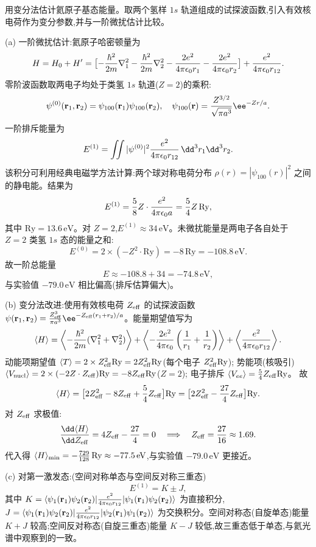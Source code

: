 \begin{question}
用变分法估计氦原子基态能量。取两个氢样 $1s$ 轨道组成的试探波函数,引入有效核电荷作为变分参数,并与一阶微扰估计比较。
\end{question}
\begin{solution}
(a) 一阶微扰估计:氦原子哈密顿量为
\[
H = H_0 + H' = \bigl[ -{\hbar^2\over2m}\nabla_1^2 - {\hbar^2\over2m}\nabla_2^2 - {2e^2\over4\pi\epsilon_0 r_1} - {2e^2\over4\pi\epsilon_0 r_2} \bigr] + {e^2\over4\pi\epsilon_0 r_{12}}.
\]
零阶波函数取两电子均处于类氢 $1s$ 轨道($Z=2$)的乘积:
\[
\psi^{(0)}(\mathbf r_1,\mathbf r_2) = \psi_{100}(\mathbf r_1)\psi_{100}(\mathbf r_2),
\quad \psi_{100}(\mathbf r) = {Z^{3/2}\over\sqrt{\pi a^3}}\ee^{-Zr/a}.
\]
一阶排斥能量为
\[
E^{(1)} = \iint |\psi^{(0)}|^2 {e^2\over4\pi\epsilon_0 r_{12}}\,\dd^3r_1\dd^3r_2.
\]
该积分可利用经典电磁学方法计算:两个球对称电荷分布 $\rho(r)=|\psi_{100}(r)|^2$ 之间的静电能。结果为
\[
E^{(1)} = {5\over8}Z\cdot{e^2\over4\pi\epsilon_0 a} = {5\over4}Z\,\mathrm{Ry},
\]
其中 $\mathrm{Ry}=13.6\,\mathrm{eV}$。对 $Z=2$,$E^{(1)}\approx34\,\mathrm{eV}$。未微扰能量是两电子各自处于 $Z=2$ 类氢 $1s$ 态的能量之和:
\[
E^{(0)} = 2\times\left(-Z^2\cdot{\mathrm{Ry}}\right) = -8\,\mathrm{Ry} = -108.8\,\mathrm{eV}.
\]
故一阶总能量
\[
E \approx -108.8 + 34 = -74.8\,\mathrm{eV},
\]
与实验值 $-79.0\,\mathrm{eV}$ 相比偏高(排斥估算偏大)。

(b) 变分法改进:使用有效核电荷 $Z_{\rm eff}$ 的试探波函数 $\psi(\mathbf r_1,\mathbf r_2) = {Z_{\rm eff}^3\over\pi a^3}\ee^{-Z_{\rm eff}(r_1+r_2)/a}$。能量期望值写为
\[
\langle H\rangle = \left\langle -{\hbar^2\over2m}(\nabla_1^2+\nabla_2^2)\right\rangle
+ \left\langle -{2e^2\over4\pi\epsilon_0}\left({1\over r_1}+{1\over r_2}\right)\right\rangle
+ \left\langle {e^2\over4\pi\epsilon_0 r_{12}}\right\rangle.
\]
动能项期望值 $\langle T\rangle = 2\times Z_{\rm eff}^2\mathrm{Ry} = 2Z_{\rm eff}^2\mathrm{Ry}$(每个电子 $Z_{\rm eff}^2\mathrm{Ry}$);
势能项(核吸引)$\langle V_{\rm nucl}\rangle = 2\times(-2Z\cdot Z_{\rm eff})\mathrm{Ry} = -8Z_{\rm eff}\mathrm{Ry}$($Z=2$);
电子排斥 $\langle V_{ee}\rangle = {5\over4}Z_{\rm eff}\mathrm{Ry}$。
故
\[
\langle H\rangle = \bigl[2Z_{\rm eff}^2 - 8Z_{\rm eff} + {5\over4}Z_{\rm eff}\bigr]\mathrm{Ry}
= \bigl[2Z_{\rm eff}^2 - {27\over4}Z_{\rm eff}\bigr]\mathrm{Ry}.
\]
对 $Z_{\rm eff}$ 求极值:
\[
{\dd\langle H\rangle\over\dd Z_{\rm eff}} = 4Z_{\rm eff} - {27\over4} = 0
\quad\Longrightarrow\quad Z_{\rm eff} = {27\over16} \approx 1.69.
\]
代入得 $\langle H\rangle_{\min} = -{729\over128}\,\mathrm{Ry} \approx -77.5\,\mathrm{eV}$,与实验值 $-79.0\,\mathrm{eV}$ 更接近。

(c) 对第一激发态:(空间对称单态与空间反对称三重态)
\[
E^{(1)} = K \pm J,
\]
其中 $K=\langle\psi_1(\mathbf r_1)\psi_2(\mathbf r_2)|{e^2\over4\pi\epsilon_0 r_{12}}|\psi_1(\mathbf r_1)\psi_2(\mathbf r_2)\rangle$ 为直接积分,$J=\langle\psi_1(\mathbf r_1)\psi_2(\mathbf r_2)|{e^2\over4\pi\epsilon_0 r_{12}}|\psi_2(\mathbf r_1)\psi_1(\mathbf r_2)\rangle$ 为交换积分。空间对称态(自旋单态)能量 $K+J$ 较高;空间反对称态(自旋三重态)能量 $K-J$ 较低,故三重态低于单态,与氦光谱中观察到的一致。
\end{solution}

